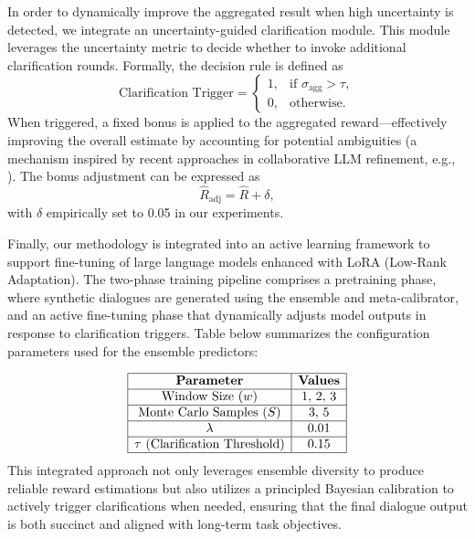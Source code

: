 \documentclass{article} %
\begin{document}
In order to dynamically improve the aggregated result when high uncertainty is detected, we integrate an uncertainty-guided clarification module. This module leverages the uncertainty metric to decide whether to invoke additional clarification rounds. Formally, the decision rule is defined as
\[
\text{Clarification Trigger} = 
\begin{cases} 
1, & \text{if } \sigma_{\text{agg}} > \tau, \\
0, & \text{otherwise.}
\end{cases}
\]
When triggered, a fixed bonus is applied to the aggregated reward—effectively improving the overall estimate by accounting for potential ambiguities (a mechanism inspired by recent approaches in collaborative LLM refinement, e.g., \cite{wu2025collabllm}). The bonus adjustment can be expressed as
\[
\hat{R}_{\text{adj}} = \hat{R} + \delta,
\]
with \(\delta\) empirically set to 0.05 in our experiments.

Finally, our methodology is integrated into an active learning framework to support fine-tuning of large language models enhanced with LoRA (Low-Rank Adaptation). The two-phase training pipeline comprises a pretraining phase, where synthetic dialogues are generated using the ensemble and meta-calibrator, and an active fine-tuning phase that dynamically adjusts model outputs in response to clarification triggers. Table below summarizes the configuration parameters used for the ensemble predictors:

\[
\begin{array}{|c|c|}
\hline
\textbf{Parameter} & \textbf{Values} \\
\hline
\text{Window Size } (w) & 1,\, 2,\, 3 \\
\hline
\text{Monte Carlo Samples } (S) & 3,\, 5 \\
\hline
\lambda & 0.01 \\
\hline
\tau\ (\text{Clarification Threshold}) & 0.15 \\
\hline
\end{array}
\]
This integrated approach not only leverages ensemble diversity to produce reliable reward estimations but also utilizes a principled Bayesian calibration to actively trigger clarifications when needed, ensuring that the final dialogue output is both succinct and aligned with long-term task objectives.
\end{document}
